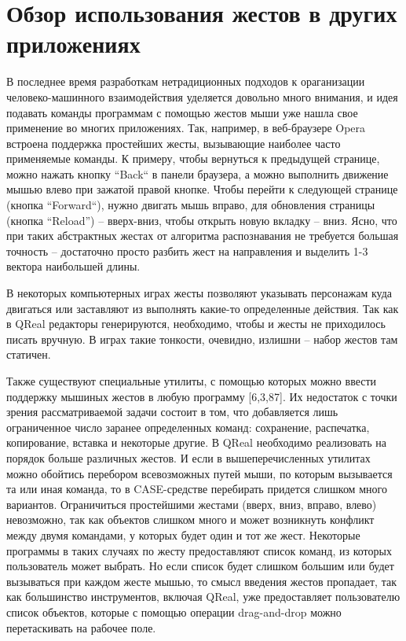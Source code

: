\documentclass[a5paper]{article}
\begin{document}
\section{Обзор использования жестов в других приложениях}

В последнее время разработкам нетрадиционных подходов к ораганизации человеко-машинного взаимодействия уделяется довольно много 
внимания, и идея подавать команды программам с помощью жестов мыши уже нашла свое применение во многих приложениях. Так, например, 
в веб-браузере Opera встроена поддержка простейших жесты, вызывающие наиболее часто применяемые команды. К примеру, чтобы вернуться 
к предыдущей странице, можно нажать кнопку ``Back`` в панели браузера, а можно выполнить движение мышью влево при зажатой правой кнопке. 
Чтобы перейти к следующей странице (кнопка ``Forward``), нужно двигать мышь вправо, для обновления страницы (кнопка ``Reload'') -- вверх-вниз,
чтобы открыть новую вкладку -- вниз. Ясно, что при таких абстрактных жестах от алгоритма распознавания не требуется
большая точность -- достаточно просто разбить жест на направления и выделить 1-3 вектора наибольшей длины.

В некоторых компьютерных играх жесты позволяют указывать персонажам куда двигаться или заставляют из выполнять какие-то определенные
действия. Так как в QReal редакторы генерируются, необходимо, чтобы и жесты не приходилось писать вручную. В играх такие тонкости, очевидно,
излишни -- набор жестов там статичен.

Также существуют специальные утилиты, с помощью которых можно ввести поддержку мышиных жестов в любую программу [6,3,87]. Их недостаток 
с точки зрения рассматриваемой задачи состоит в том, что добавляется лишь ограниченное число заранее определенных команд: 
сохранение, распечатка, копирование, вставка и некоторые другие. В QReal необходимо реализовать на порядок больше различных жестов. И если в
вышеперечисленных утилитах можно обойтись перебором всевозможных путей мыши, по которым вызывается та или иная команда, то в CASE-средстве 
перебирать придется слишком много вариантов. Ограничиться простейшими жестами (вверх, вниз, вправо, влево) невозможно, так как 
объектов слишком много и может возникнуть конфликт между двумя командами, у которых будет один и тот же жест. Некоторые программы 
в таких случаях по жесту предоставляют список команд, из которых пользователь может выбрать. Но если список будет слишком большим или 
будет вызываться при каждом жесте мышью, то смысл введения жестов пропадает, так как большинство инструментов, включая QReal, уже 
предоставляет пользователю список объектов, которые с помощью операции drag-and-drop можно перетаскивать на рабочее поле.
\end{document}

